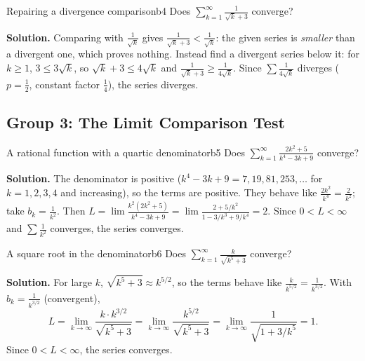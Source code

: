 \documentclass[11pt]{article}
\begin{document}
\begin{exmp}{Repairing a divergence comparison}{b4}
Does $\displaystyle\sum_{k=1}^\infty\frac1{\sqrt k+3}$ converge?

\textbf{Solution.} Comparing with $\frac1{\sqrt k}$ gives $\frac1{\sqrt k+3}<\frac1{\sqrt k}$: the given series is \emph{smaller} than a divergent one, which proves nothing. Instead find a divergent series below it: for $k\ge1$, $3\le3\sqrt k$, so $\sqrt k+3\le4\sqrt k$ and $\frac1{\sqrt k+3}\ge\frac1{4\sqrt k}$. Since $\sum\frac1{4\sqrt k}$ diverges ($p=\frac12$, constant factor $\frac14$), the series diverges.
\end{exmp}

\subsection*{Group 3: The Limit Comparison Test}

\begin{exmp}{A rational function with a quartic denominator}{b5}
Does $\displaystyle\sum_{k=1}^\infty\frac{2k^2+5}{k^4-3k+9}$ converge?

\textbf{Solution.} The denominator is positive ($k^4-3k+9=7,19,81,253,\dots$ for $k=1,2,3,4$ and increasing), so the terms are positive. They behave like $\frac{2k^2}{k^4}=\frac2{k^2}$; take $b_k=\frac1{k^2}$. Then $L=\lim\frac{k^2(2k^2+5)}{k^4-3k+9}=\lim\frac{2+5/k^2}{1-3/k^3+9/k^4}=2$. Since $0<L<\infty$ and $\sum\frac1{k^2}$ converges, the series converges.
\end{exmp}

\begin{exmp}{A square root in the denominator}{b6}
Does $\displaystyle\sum_{k=1}^\infty\frac k{\sqrt{k^5+3}}$ converge?

\textbf{Solution.} For large $k$, $\sqrt{k^5+3}\approx k^{5/2}$, so the terms behave like $\frac k{k^{5/2}}=\frac1{k^{3/2}}$. With $b_k=\frac1{k^{3/2}}$ (convergent),
\[
L=\lim_{k\to\infty}\frac{k\cdot k^{3/2}}{\sqrt{k^5+3}}=\lim_{k\to\infty}\frac{k^{5/2}}{\sqrt{k^5+3}}=\lim_{k\to\infty}\frac1{\sqrt{1+3/k^5}}=1 .
\]
Since $0<L<\infty$, the series converges.
\end{exmp}
\end{document}

